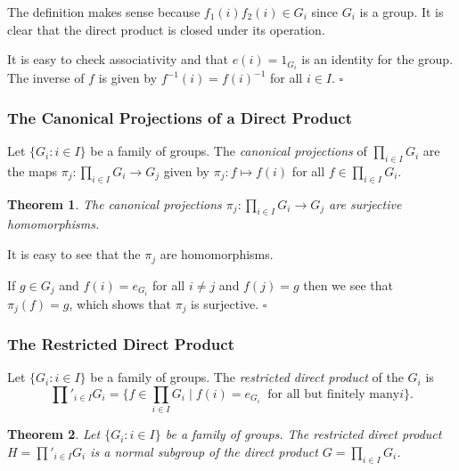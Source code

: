 \documentclass[10pt]{article}
\newtheorem{theorem}{Theorem}[section]
\newenvironment{proof}[1][Proof]{\begin{trivlist}
\item[\hskip \labelsep {\itshape #1}]}{\end{trivlist}}
\newenvironment{definition}[1][Definition]{\begin{trivlist}
\item[\hskip \labelsep {\bfseries #1}]}{\end{trivlist}}
\begin{document}
\begin{proof}
The definition makes sense because $f_1(i)f_2(i) \in G_i$ since $G_i$ is a group. It is clear that the direct product is closed under its operation.

It is easy to check associativity and that $e(i) = 1_{G_i}$ is an identity for the group. The inverse of $f$ is given by $f^{-1}(i) = f(i)^{-1}$ for all $i \in I$. $\square$
\end{proof}

\subsubsection{The Canonical Projections of a Direct Product}

\begin{definition}
Let $\{G_i : i \in I\}$ be a family of groups. The \emph{canonical projections} of $\prod_{i \in I} G_i$ are the maps $\pi_j : \prod_{i \in I} G_i \to G_j$ given by $\pi_j : f \mapsto f(i)$ for all $f \in \prod_{i \in I} G_i$.
\end{definition}

\begin{theorem}
The canonical projections $\pi_j : \prod_{i \in I} G_i \to G_j$ are surjective homomorphisms.
\end{theorem}

\begin{proof}
It is easy to see that the $\pi_j$ are homomorphisms.

If $g \in G_j$ and $f(i) = e_{G_i}$ for all $i \neq j$ and $f(j) = g$ then we see that $\pi_j(f) = g$, which shows that $\pi_j$ is surjective. $\square$
\end{proof}

\subsubsection{The Restricted Direct Product}

\begin{definition}
Let $\{G_i : i \in I\}$ be a family of groups. The \emph{restricted direct product} of the $G_i$ is
$$\prod'_{i \in I} G_i = \{f \in \prod_{i \in I} G_i \;|\; f(i) = e_{G_i} \;\;\mbox{for all but finitely many} i\}.$$
\end{definition}

\begin{theorem}
Let $\{G_i : i \in I\}$ be a family of groups. The restricted direct product $H = \prod'_{i \in I} G_i$ is a normal subgroup of the direct product $G = \prod_{i \in I} G_i$.
\end{theorem}
\end{document}
